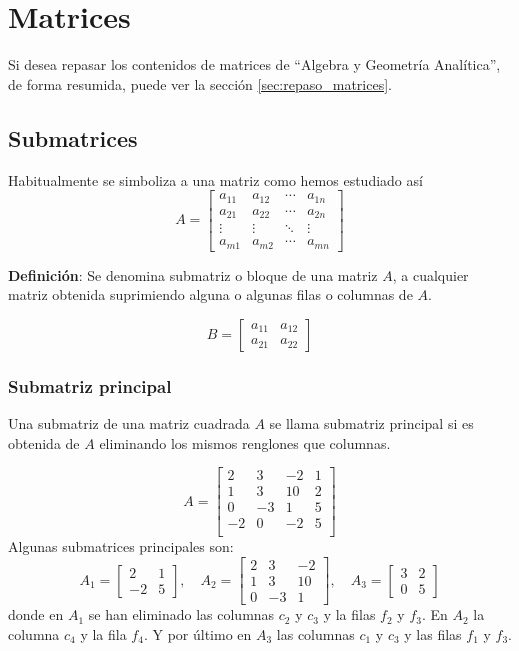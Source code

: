 \section{Matrices}

Si desea repasar los contenidos de matrices de ``Algebra y Geometría Analítica'', de forma resumida, puede ver la sección \ref{sec:repaso_matrices}.

\subsection{Submatrices}

Habitualmente se simboliza a una matriz como hemos estudiado así
\[
A = \begin{bmatrix}
  a_{11} & a_{12} & \cdots & a_{1n}\\
  a_{21} & a_{22} & \cdots & a_{2n}\\
  \vdots & \vdots & \ddots & \vdots \\
  a_{m1} & a_{m2} & \cdots & a_{mn}
\end{bmatrix}
\]

\textbf{Definición}: Se denomina submatriz o bloque de una matriz \(A\), a cualquier matriz obtenida suprimiendo alguna o algunas filas o columnas de \(A\).

\[
B = \begin{bmatrix}
  a_{11} & a_{12}\\
  a_{21} & a_{22}
\end{bmatrix}
\]

\subsubsection{Submatriz principal}

Una submatriz de una matriz cuadrada \(A\) se llama submatriz principal si es obtenida de \(A\) eliminando los mismos renglones que columnas. 

\[
A = \begin{bmatrix}
  2 & 3 & -2 & 1\\
  1 & 3 & 10 & 2\\
  0 & -3 & 1 & 5\\
  -2 & 0 & -2 & 5\\
\end{bmatrix}
\]
Algunas submatrices principales son:
\[
  A_1 =\begin{bmatrix}
    2 & 1 \\
    -2 & 5
  \end{bmatrix},\quad A_2 = \begin{bmatrix}
    2 & 3 & -2 \\
    1 & 3 & 10 \\
    0 & -3 & 1 
  \end{bmatrix}, \quad A_3 = \begin{bmatrix}
    3 & 2\\
    0 & 5 
  \end{bmatrix}
\]
donde en \(A_1\) se han eliminado las columnas \(c_2\) y \(c_3\) y la filas \(f_2\) y \(f_3\). En \(A_2\) la columna \(c_4\) y la fila \(f_4\). Y por último en \(A_3\) las columnas \(c_1\) y \(c_3\) y las filas \(f_1\) y \(f_3\).

